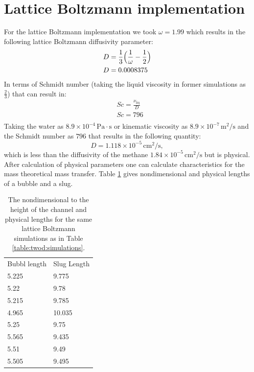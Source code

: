 \documentclass{article}
\begin{document}
\section{Lattice Boltzmann implementation}
For the lattice Boltzmann implementation we took $\omega=1.99$ which results in the following
lattice Boltzmann diffusivity parameter:
\begin{equation}
\begin{aligned}
&D=\frac{1}{3}\Bigl(\frac{1}{\omega}-\frac{1}{2}\Bigr)\\
&D=0.0008375
\end{aligned}
\end{equation}
In terms of Schmidt number (taking the liquid viscosity in former simulations as $\frac{2}{3}$) that
can result in:
\begin{equation}
\begin{aligned}
&Sc=\frac{\nu_{\mathrm{liq}}}{D}\\
&Sc=796\\
\end{aligned}
\end{equation}
Taking the water as $8.9 \times 10^{-4}\,\mathrm{Pa\cdot s}$ or kinematic viscosity as $8.9 \times
10^{-7} \,\mathrm{m^2/s}$ and the Schmidt number as $796$ that results in the following quantity:
\begin{equation}
D=1.118\times 10^{-5}\,\mathrm{cm^2/s},
\end{equation}
which is less than the diffusivity of the methane $1.84\times 10^{-5}\,\mathrm{cm^2/s}$ but is
physical. After calculation of physical parameters one can calculate characteristics for the mass
theoretical mass transfer. Table \ref{table:lengths} gives nondimensional and physical lengths of a
bubble and a slug.
\begin{table}
\begin{tabularx}{\textwidth}{|X|X|}
Bubbl length& Slug Length\\
5.225&9.775\\
5.22&9.78\\
5.215&9.785\\
4.965&10.035\\
5.25&9.75\\
5.565&9.435\\
5.51&9.49\\
5.505&9.495\\
\end{tabularx}
\caption{The nondimensional to the height of the channel and physical lengths for the same lattice
Boltzmann simulations as in Table \ref{table:twod:simulations}. \label{table:lengths}}
\end{table}
\end{document}
